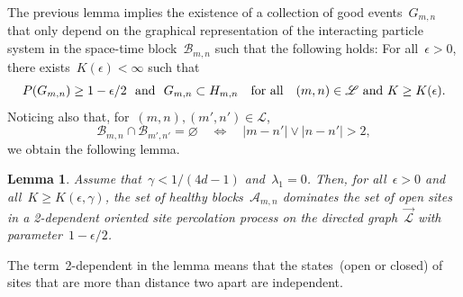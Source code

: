 \documentclass[letterpaper,11pt,twoside,keywordsasfootnote,addressatend,noinfoline]{article}
\newtheorem{lemma}[theorem]{Lemma}
\newcommand{\A}{\mathscr{A}}
\newcommand{\B}{\mathscr{B}}
\newcommand{\Lat}{\mathscr{L}}
\newcommand{\ep}{\epsilon}
\begin{document}
 The previous lemma implies the existence of a collection of good events~$G_{m, n}$ that only depend on the graphical representation of the interacting particle system in the space-time block~$\B_{m, n}$ such that the following holds: For all~$\ep > 0$, there exists~$K (\ep) < \infty$ such that 
 $$ P (G_{m, n}) \geq 1 - \ep / 2 \ \ \hbox{and} \ \ G_{m, n} \subset H_{m, n} \quad \hbox{for all} \quad (m, n) \in \Lat \ \hbox{and} \ K \geq K (\ep). $$
 Noticing also that, for~$(m, n), (m', n') \in \Lat$,
 $$ \B_{m, n} \cap \B_{m', n'} = \varnothing \quad \Longleftrightarrow \quad |m - n'| \vee |n - n'| > 2, $$
 we obtain the following lemma.
\begin{lemma}
\label{lem:perco-1}
 Assume that~$\gamma < 1 / (4d - 1)$ and~$\lambda_1 = 0$.
 Then, for all~$\ep > 0$ and all~$K \geq K (\ep, \gamma)$, the set of healthy blocks~$\A_{m, n}$ dominates the set of open sites in a 2-dependent oriented site percolation process on the directed graph~$\vec{\Lat}$ with parameter~$1 - \ep / 2$.
\end{lemma}
 The term~2-dependent in the lemma means that the states~(open or closed) of sites that are more than distance two apart are independent.

\end{document}
